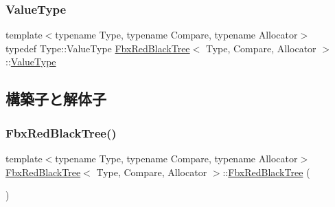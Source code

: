 \mbox{\label{class_fbx_red_black_tree_a178e34888fa8c0fab5a7527ab30a663c}} 
\subsubsection{\texorpdfstring{Value\+Type}{ValueType}}
{\footnotesize\ttfamily template$<$typename Type, typename Compare, typename Allocator$>$ \\
typedef Type\+::\+Value\+Type \hyperlink{class_fbx_red_black_tree}{Fbx\+Red\+Black\+Tree}$<$ Type, Compare, Allocator $>$\+::\hyperlink{class_fbx_red_black_tree_a178e34888fa8c0fab5a7527ab30a663c}{Value\+Type}}



\subsection{構築子と解体子}
\mbox{\label{class_fbx_red_black_tree_a53f5ee11b3aa618b7ebc7b2ff1654d40}} 
\subsubsection{\texorpdfstring{Fbx\+Red\+Black\+Tree()}{FbxRedBlackTree()}\hspace{0.1cm}{\footnotesize\ttfamily [1/2]}}
{\footnotesize\ttfamily template$<$typename Type, typename Compare, typename Allocator$>$ \\
\hyperlink{class_fbx_red_black_tree}{Fbx\+Red\+Black\+Tree}$<$ Type, Compare, Allocator $>$\+::\hyperlink{class_fbx_red_black_tree}{Fbx\+Red\+Black\+Tree} (\begin{DoxyParamCaption}{ }\end{DoxyParamCaption})}

\mbox{\label{class_fbx_red_black_tree_a2c4ff0fca7f156a399bc83d3e8822485}} 
